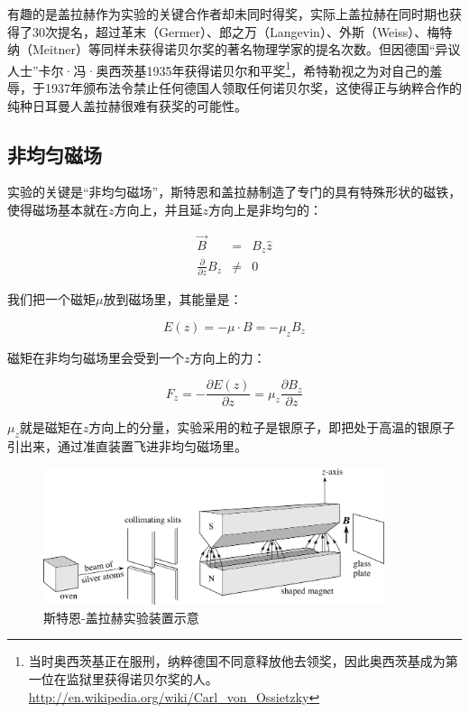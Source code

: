 有趣的是盖拉赫作为实验的关键合作者却未同时得奖，实际上盖拉赫在同时期也获得了30次提名，超过革末（Germer）、郎之万（Langevin）、外斯（Weiss）、梅特纳（Meitner）等同样未获得诺贝尔奖的著名物理学家的提名次数。但因德国“异议人士”卡尔·冯·奥西茨基1935年获得诺贝尔和平奖\footnote{当时奥西茨基正在服刑，纳粹德国不同意释放他去领奖，因此奥西茨基成为第一位在监狱里获得诺贝尔奖的人。\url{http://en.wikipedia.org/wiki/Carl_von_Ossietzky}}，希特勒视之为对自己的羞辱，于1937年颁布法令禁止任何德国人领取任何诺贝尔奖，这使得正与纳粹合作的纯种日耳曼人盖拉赫很难有获奖的可能性。

\subsection{非均匀磁场}

实验的关键是“非均匀磁场”，斯特恩和盖拉赫制造了专门的具有特殊形状的磁铁，使得磁场基本就在$z$方向上，并且延$z$方向上是非均匀的：

\begin{eqnarray}
\vec B & =  & B_z \hat z \\
\frac{\partial }{\partial z} B_z & \neq & 0
\end{eqnarray}

我们把一个磁矩$\mu$放到磁场里，其能量是：

\begin{equation}
E(z) = - \mu \cdot B = - \mu_z B_z  
\end{equation}

磁矩在非均匀磁场里会受到一个$z$方向上的力：

\begin{equation}
F_z = - \frac{\partial E(z)}{\partial z} = \mu_z \frac{\partial B_z}{\partial z}
\end{equation}

$\mu_z$就是磁矩在$z$方向上的分量，实验采用的粒子是银原子，即把处于高温的银原子引出来，通过准直装置飞进非均匀磁场里。

\begin{figure}[htbp]
\begin{center}
\includegraphics[width=10cm]{SGExperiment/SGexperiment.png}
\caption{斯特恩-盖拉赫实验装置示意}
\end{center}
\end{figure}

